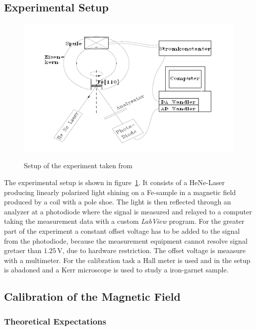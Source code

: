 \documentclass[a4paper,10pt]{scrartcl}
\begin{document}
\subsection{Experimental Setup \label{sec:setup}}

\begin{figure}
\centering
\includegraphics[scale=0.9]{img/setup}
\label{fig:setup}
\caption{Setup of the experiment taken from \cite{skript}}
\end{figure}

The experimental setup is shown in figure~\ref{fig:setup}. It consists of a HeNe-Laser producing linearly polarized light shining on a Fe-sample in a magnetic field produced by a coil with a pole shoe. The light is then reflected through an analyzer at a photodiode where the signal is measured and relayed to a computer taking the measurement data with a custom \textit{LabView} program.  For the greater part of the experiment a constant offset voltage has to be added to the signal from the photodiode, because the measurement equipment cannot resolve signal gretaer than $1.25\,$V, due to hardware restriction. The offset voltage is meaasure with a multimeter.
For the calibration task a Hall meter is used and in the setup is abadoned and a Kerr microscope is used to study a iron-garnet sample.

\subsection{Calibration of the Magnetic Field}

\subsubsection{Theoretical Expectations}
\end{document}
